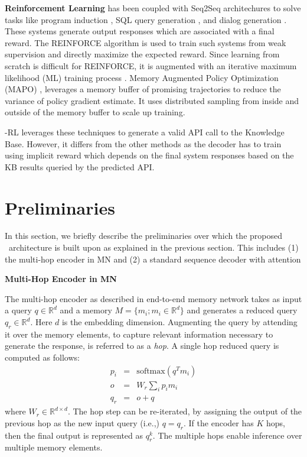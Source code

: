 \vspace{0.5ex}
\noindent\textbf{Reinforcement Learning} has been coupled with Seq2Seq architechures to solve tasks like program induction \cite{liang2017neural, zaremba2015reinforcement}, SQL query generation \cite{NIPS2018_8204, zhong2017seq2sql}, and dialog generation \cite{li2016deep}. These systems generate output responses which are associated with a final reward. The REINFORCE \cite{williams1992simple} algorithm is used to train such systems from weak supervision and directly maximize the expected reward. Since learning from scratch is difficult for REINFORCE, it is augmented with an iterative maximum likelihood (ML) training process \cite{liang2017neural}. Memory Augmented Policy Optimization (MAPO) \cite{NIPS2018_8204}, leverages a memory buffer of promising trajectories to reduce the variance of policy gradient estimate. It uses distributed sampling from inside and outside of the memory buffer to scale up training.

\sys -RL leverages these techniques to generate a valid API call to the Knowledge Base. However, it differs from the other methods as the decoder has to train using implicit reward which depends on the final system responses based on the KB results queried by the predicted API.

\section{Preliminaries}
\label{sec:prelims}
In this section, we briefly describe the preliminaries over which the proposed \sys\ architecture is built upon as explained in the previous section. This includes (1) the multi-hop encoder in MN and (2) a standard sequence decoder with attention \cite{bahdanau2014neural}

\noindent\textbf{Multi-Hop Encoder in MN}
\label{ssec:mhencoder}

The multi-hop encoder as described in end-to-end memory network \cite{sukhbaatar2015end} takes as input a query $q \in \mathbb{R}^{d}$ and a memory $M = \{ m_i; m_i \in \mathbb{R}^{d}\}$ and generates a reduced query $q_r \in \mathbb{R}^{d}$. Here $d$ is the embedding dimension. Augmenting the query by attending it over the memory elements, to capture relevant information necessary to generate the response, is referred to as a \textit{hop}. A single hop reduced query is computed as follows:
\begin{eqnarray}
p_i &=& \text{softmax}(q^T m_i) \\
o &=& W_r \sum\nolimits_i p_i m_i \\
q_r &=& o + q
\end{eqnarray}
where $W_r \in \mathbb{R}^{d \times d}$. The hop step can be re-iterated, by assigning the output of the previous hop as the new input query (i.e.,) $q=q_r$. If the encoder has $K$ hops, then the final output is represented as $q^k_r$. The multiple hops enable inference over multiple memory elements.

